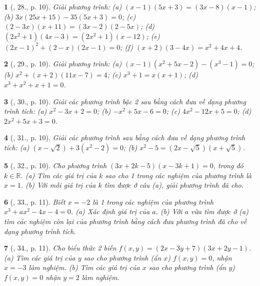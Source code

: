 \documentclass{article}
\newtheorem{baitoan}{}
\begin{document}
\begin{baitoan}[\cite{SBT_Toan_8_tap_2}, 28., p. 10]
	Giải phương trình: (a) $(x - 1)(5x + 3) = (3x - 8)(x - 1)$; (b) $3x(25x + 15) - 35(5x + 3) = 0$; (c) $(2 - 3x)(x + 11) = (3x - 2)(2 - 5x)$; (d) $(2x^2 + 1)(4x - 3) = (2x^2 + 1)(x - 12)$; (e) $(2x - 1)^2 + (2 - x)(2x - 1) = 0$; (f) $(x + 2)(3 - 4x) = x^2 + 4x + 4$.
\end{baitoan}

\begin{baitoan}[\cite{SBT_Toan_8_tap_2}, 29., p. 10]
	Giải phương trình: (a) $(x - 1)(x^2 + 5x - 2) - (x^3 - 1) = 0$; (b) $x^2 + (x + 2)(11x - 7) = 4$; (c) $x^3 + 1 = x(x + 1)$; (d) $x^3 + x^2 + x + 1 = 0$.
\end{baitoan}

\begin{baitoan}[\cite{SBT_Toan_8_tap_2}, 30., p. 10]
	Giải các phương trình bậc 2 sau bằng cách đưa về dạng phương trình tích: (a) $x^2 - 3x + 2 = 0$; (b) $-x^2 + 5x - 6 = 0$; (c) $4x^2 - 12x + 5 = 0$; (d) $2x^2 + 5x + 3 = 0$.
\end{baitoan}

\begin{baitoan}[\cite{SBT_Toan_8_tap_2}, 31., p. 10]
	Giải các phương trình sau bằng cách đưa về dạng phương trình tích: (a) $(x - \sqrt{2}) + 3(x^2 - 2) = 0$; (b) $x^2 - 5 = (2x - \sqrt{5})(x + \sqrt{5})$.
\end{baitoan}

\begin{baitoan}[\cite{SBT_Toan_8_tap_2}, 32., p. 10]
	Cho phương trình $(3x + 2k - 5)(x - 3k + 1) = 0$, trong đó $k\in\mathbb{R}$. (a) Tìm các giá trị của $k$ sao cho 1 trong các nghiệm của phương trình là $x = 1$. (b) Với mỗi giá trị của $k$ tìm được ở câu (a), giải phương trình đã cho.
\end{baitoan}

\begin{baitoan}[\cite{SBT_Toan_8_tap_2}, 33., p. 11]
	Biết $x = -2$ là 1 trong các nghiệm của phương trình $x^3 + ax^2 - 4x - 4 = 0$. (a) Xác định giá trị của $a$. (b) Với $a$ vừa tìm được ở (a) tìm các nghiệm còn lại của phương trình bằng cách đưa phương trình đã cho về dạng phương trình tích.
\end{baitoan}

\begin{baitoan}[\cite{SBT_Toan_8_tap_2}, 34., p. 11]
	Cho biểu thức 2 biến $f(x,y) = (2x - 3y + 7)(3x + 2y - 1)$. (a) Tìm các giá trị của $y$ sao cho phương trình (ẩn $x$) $f(x,y) = 0$, nhận $x = -3$ làm nghiệm. (b) Tìm các giá trị của $x$ sao cho phương trình (ẩn $y$) $f(x,y) = 0$ nhận $y = 2$ làm nghiệm.
\end{baitoan}
\end{document}
